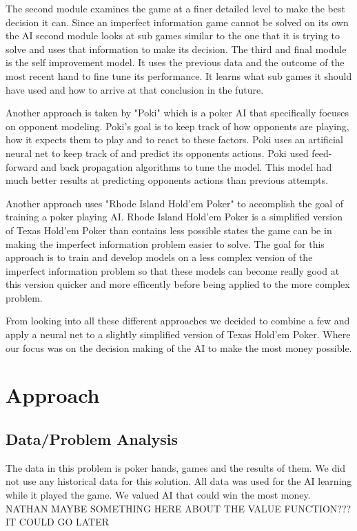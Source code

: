 The second module examines the game at a finer detailed level to make the best decision it can. Since an imperfect information game cannot be solved on its own the AI second module looks at sub games similar to the one that it is trying to solve and uses that information to make its decision\cite{brown2017libratus}. The third and final module is the self improvement model. It uses the previous data and the outcome of the most recent hand to fine tune its performance. It learns what sub games it should have used and how to arrive at that conclusion in the future\cite{brown2017libratus}.

Another approach is taken by "Poki" which is a poker AI that specifically focuses on opponent modeling\cite{davidson2000improved}. Poki's goal is to keep track of how opponents are playing, how it expects them to play and to react to these factors. Poki uses an artificial neural net to keep track of and predict its opponents actions. Poki used feed-forward and back propagation algorithms to tune the model. This model had much better results at predicting opponents actions than previous attempts\cite{davidson2000improved}.

Another approach uses "Rhode Island Hold’em Poker" to accomplish the goal of training a poker playing AI. Rhode Island Hold'em Poker is a simplified version of Texas Hold'em Poker than contains less possible states the game can be in making the imperfect information problem easier to solve\cite{gilpin2005optimal}. The goal for this approach is to train and develop models on a less complex version of the imperfect information problem so that these models can become really good at this version quicker and more efficently before being applied to the more complex problem\cite{gilpin2005optimal}.

From looking into all these different approaches we decided to combine a few and apply a neural net to a slightly simplified version of Texas Hold'em Poker. Where our focus was on the decision making of the AI to make the most money possible.

\section{Approach}
\subsection{Data/Problem Analysis}
The data in this problem is poker hands, games and the results of them. We did not use any historical data for
this solution. All data was used for the AI learning while it played the game. We valued AI that could win the
most money. NATHAN MAYBE SOMETHING HERE ABOUT THE VALUE FUNCTION??? IT COULD GO LATER

